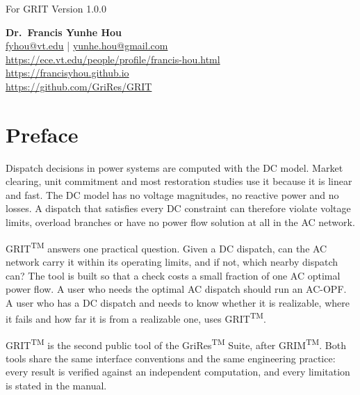 \documentclass[a4paper,11pt]{article}
\newcommand{\TM}{\textsuperscript{TM}}
\newcommand{\GRIM}{GRIM\TM}
\newcommand{\GRIT}{GRIT\TM}
\begin{document}
\begin{titlepage}
{\small\sffamily\color{black!50} For GRIT Version 1.0.0}

\vspace{1.5cm}

\begin{center}
{\Large\bfseries\sffamily Dr.\ Francis Yunhe Hou}\\[0.2cm]
{\small\sffamily \url{fyhou@vt.edu} \hspace{0.3cm}|\hspace{0.3cm} \url{yunhe.hou@gmail.com}}\\[0.1cm]
{\small\sffamily \url{https://ece.vt.edu/people/profile/francis-hou.html}}\\[0.1cm]
{\small\sffamily \url{https://francisyhou.github.io}}\\[0.1cm]
{\small\sffamily \url{https://github.com/GriRes/GRIT}}
\end{center}

\end{titlepage}

\tableofcontents
\newpage

\section*{Preface}

\begingroup
\large
\setlength{\parindent}{0pt}
\setlength{\parskip}{1.2em}

Dispatch decisions in power systems are computed with the DC model. Market clearing, unit commitment and most restoration studies use it because it is linear and fast. The DC model has no voltage magnitudes, no reactive power and no losses. A dispatch that satisfies every DC constraint can therefore violate voltage limits, overload branches or have no power flow solution at all in the AC network.

\GRIT{} answers one practical question. Given a DC dispatch, can the AC network carry it within its operating limits, and if not, which nearby dispatch can? The tool is built so that a check costs a small fraction of one AC optimal power flow. A user who needs the optimal AC dispatch should run an AC-OPF. A user who has a DC dispatch and needs to know whether it is realizable, where it fails and how far it is from a realizable one, uses \GRIT.

\GRIT{} is the second public tool of the GriRes\TM{} Suite, after \GRIM{}. Both tools share the same interface conventions and the same engineering practice: every result is verified against an independent computation, and every limitation is stated in the manual.
\end{document}
